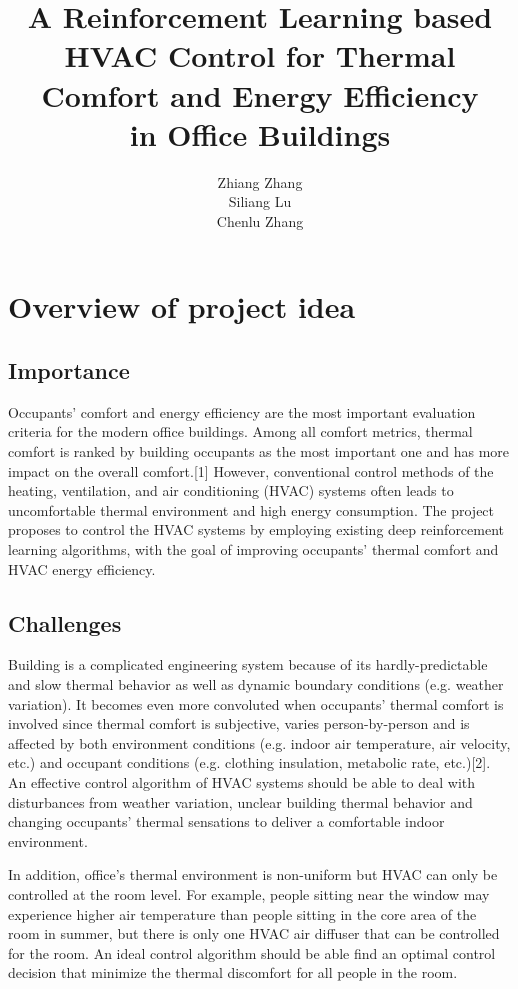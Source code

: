 \documentclass{article}
\title{A Reinforcement Learning based HVAC Control for Thermal Comfort and Energy Efficiency \\in Office Buildings
}
\author{
  Zhiang Zhang\\
  \And 
  Siliang Lu\\
  \And 
  Chenlu Zhang\\
}
\begin{document}

\maketitle


\section{Overview of project idea}
\subsection{Importance}
Occupants' comfort and energy efficiency are the most important evaluation criteria for the modern office buildings. Among all comfort metrics, thermal comfort is ranked by building occupants as the most important one and has more impact on the overall comfort.[1] However, conventional control methods of the heating, ventilation, and air conditioning (HVAC) systems often leads to uncomfortable thermal environment and high energy consumption. The project proposes to control the HVAC systems by employing existing deep reinforcement learning algorithms, with the goal of improving occupants' thermal comfort and HVAC energy efficiency.

\subsection{Challenges}
Building is a complicated engineering system because of its hardly-predictable and slow thermal behavior as well as dynamic boundary conditions (e.g. weather variation). It becomes even more convoluted when occupants' thermal comfort is involved since thermal comfort is subjective, varies person-by-person and is affected by both environment conditions (e.g. indoor air temperature, air velocity, etc.) and occupant conditions (e.g. clothing insulation, metabolic rate, etc.)[2]. An effective control algorithm of HVAC systems should be able to deal with disturbances from weather variation, unclear building thermal behavior and changing  occupants' thermal sensations to deliver a comfortable indoor environment. 

In addition, office's thermal environment is non-uniform but HVAC can only be controlled at the room level. For example, people sitting near the window may experience higher air temperature than people sitting in the core area of the room in summer, but there is only one HVAC air diffuser that can be controlled for the room. An ideal control algorithm should be able find an optimal control decision that minimize the thermal discomfort for all people in the room. 
\end{document}
